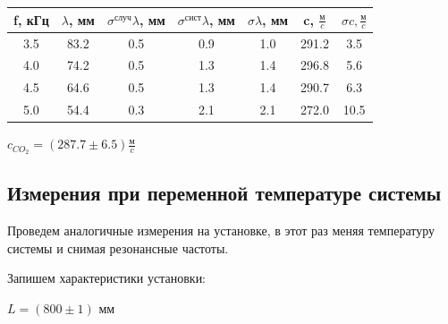 \documentclass[12pt,a4paper]{article}
\begin{document}
\begin{center}
\begin{tabular}{|c|c|c|c|c|c|c|}
 \hline 
 f, кГц & $\lambda$, мм & $\sigma^{\text{случ}}{\lambda}$, мм & $\sigma^{\text{сист}}{\lambda}$, мм & $\sigma{\lambda}$, мм & c, $\frac{\text{м}}{c}$ & $\sigma{c}, \frac{\text{м}}{c}$ \\ 
 \hline 
 3.5 & 83.2 & 0.5 & 0.9 & 1.0 & 291.2 & 3.5 \\ 
 \hline 
 4.0 & 74.2 & 0.5 & 1.3 & 1.4 & 296.8 & 5.6 \\ 
 \hline 
 4.5 & 64.6 & 0.5 & 1.3 & 1.4 & 290.7 & 6.3 \\ 
 \hline 
 5.0 & 54.4 & 0.3 & 2.1 & 2.1 & 272.0 & 10.5 \\ 
 \hline 
 \end{tabular}  
\end{center}

$c_{CO_{2}} = (287.7 \pm 6.5)\frac{\text{м}}{c}$

\subsection{Измерения при переменной температуре системы}

Проведем аналогичные измерения на установке, в этот раз меняя температуру системы и снимая резонансные частоты.

Запишем характеристики установки:

$L = (800 \pm 1)$ мм
\end{document}
